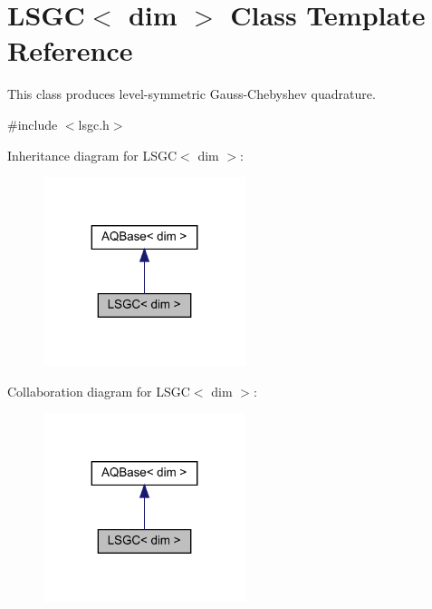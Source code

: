 \hypertarget{class_l_s_g_c}{}\section{L\+S\+GC$<$ dim $>$ Class Template Reference}
\label{class_l_s_g_c}


This class produces level-\/symmetric Gauss-\/\+Chebyshev quadrature.  




{\ttfamily \#include $<$lsgc.\+h$>$}



Inheritance diagram for L\+S\+GC$<$ dim $>$\+:\nopagebreak
\begin{figure}[H]
\begin{center}
\leavevmode
\includegraphics[width=167pt]{class_l_s_g_c__inherit__graph}
\end{center}
\end{figure}


Collaboration diagram for L\+S\+GC$<$ dim $>$\+:\nopagebreak
\begin{figure}[H]
\begin{center}
\leavevmode
\includegraphics[width=167pt]{class_l_s_g_c__coll__graph}
\end{center}
\end{figure}
